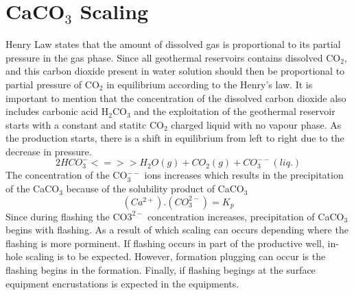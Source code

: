 \section{CaCO$_3$ Scaling}
\newline\newline

Henry Law states that the amount of dissolved gas is proportional to its partial pressure in the gas phase. Since all geothermal reservoirs contains dissolved CO$_2$, and this carbon dioxide present in water solution should then be proportional to partial pressure of CO$_2$ in equilibrium according to  the Henry's law. It is important to mention that the concentration of the dissolved carbon dioxide also includes carbonic acid H$_2$CO$_3$ and the exploitation of the geothermal reservoir starts with a constant and statitc CO$_2$ charged liquid with no vapour phase. As the production starts, there is a shift in equilibrium from left to right due to the decrease in pressure.\cite{corsi1986scaling}
\begin{equation}
    2HCO_3^- <=>> H_2O(g) + CO_2(g) + CO_3^{--}(liq.)
\end{equation}
The concentration of the CO$_3^{--}$ ions increases which results in the precipitation of the CaCO$_3$ because of the solubility product of CaCO$_3$
\begin{equation}
    (Ca^{2+}).(CO_3^{2-})=K_p
\end{equation}
Since during flashing the CO$3^{2-}$ concentration increases, precipitation of CaCO$_3$ begins with flashing. As a result of which scaling can occurs depending where the flashing is more porminent. If flashing occurs in part of the productive well, in-hole scaling is to be expected. However, formation plugging can occur is the flashing begins in the formation. Finally, if flashing begings at the surface equipment encrustations is expected in the equipments. \cite{corsi1986scaling}\cite{papic1991scaling}

